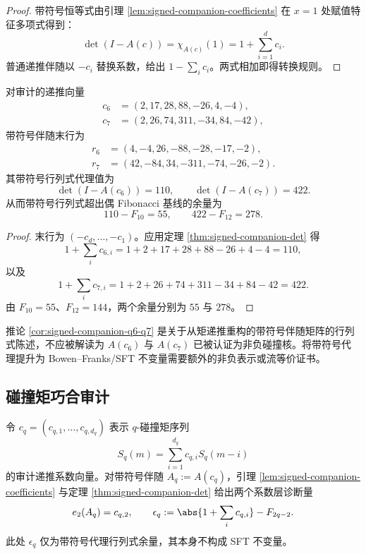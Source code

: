 \documentclass[../../main.tex]{subfiles}
\begin{document}
\begin{proof}
带符号恒等式由引理 \ref{lem:signed-companion-coefficients} 在 \(x=1\) 处赋值特征多项式得到：
\[
    \det(I-A(c))=\chi_{A(c)}(1)=1+\sum_{i=1}^d c_i.
\]
普通递推伴随以 \(-c_i\) 替换系数，给出 \(1-\sum_i c_i\)。两式相加即得转换规则。
\end{proof}

\begin{corollary}[\(q=6,7\) 带符号代理行列式]\label{cor:signed-companion-q6-q7}
对审计的递推向量
\[
\begin{aligned}
c_6&=(2,17,28,88,-26,4,-4),\\
c_7&=(2,26,74,311,-34,84,-42),
\end{aligned}
\]
带符号伴随末行为
\[
\begin{aligned}
r_6&=(4,-4,26,-88,-28,-17,-2),\\
r_7&=(42,-84,34,-311,-74,-26,-2).
\end{aligned}
\]
其带符号行列式代理值为
\[
    \det(I-A(c_6))=110,\qquad \det(I-A(c_7))=422.
\]
从而带符号行列式超出偶 Fibonacci 基线的余量为
\[
    110-F_{10}=55,\qquad 422-F_{12}=278.
\]
\end{corollary}

\begin{proof}
末行为 \((-c_d,\ldots,-c_1)\)。应用定理 \ref{thm:signed-companion-det} 得
\[
1+\sum_i c_{6,i}=1+2+17+28+88-26+4-4=110,
\]
以及
\[
1+\sum_i c_{7,i}=1+2+26+74+311-34+84-42=422.
\]
由 \(F_{10}=55\)、\(F_{12}=144\)，两个余量分别为 \(55\) 与 \(278\)。
\end{proof}

\begin{remark}[代理边界]\label{rem:signed-companion-proxy-boundary}
推论 \ref{cor:signed-companion-q6-q7} 是关于从矩递推重构的带符号伴随矩阵的行列式陈述，不应被解读为 \(A(c_6)\) 与 \(A(c_7)\) 已被认证为非负碰撞核。将带符号代理提升为 Bowen--Franks/SFT 不变量需要额外的非负表示或流等价证书。
\end{remark}

\subsection{碰撞矩巧合审计}

令 \(c_q=(c_{q,1},\ldots,c_{q,d_q})\) 表示 \(q\)-碰撞矩序列
\[
    S_q(m)=\sum_{i=1}^{d_q} c_{q,i}S_q(m-i)
\]
的审计递推系数向量。对带符号伴随 \(A_q:=A(c_q)\)，引理 \ref{lem:signed-companion-coefficients} 与定理 \ref{thm:signed-companion-det} 给出两个系数层诊断量
\[
    e_2(A_q)=c_{q,2},
    \qquad
    \epsilon_q:=\abs{1+\sum_i c_{q,i}}-F_{2q-2}.
\]
此处 \(\epsilon_q\) 仅为带符号代理行列式余量，其本身不构成 SFT 不变量。
\end{document}
